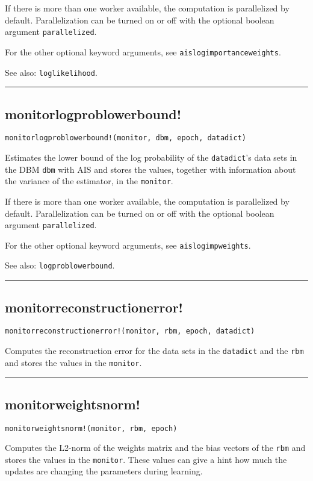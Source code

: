 If there is more than one worker available, the computation is parallelized by default. Parallelization can be turned on or off with the optional boolean argument \texttt{parallelized}.

For the other optional keyword arguments, see \texttt{aislogimportanceweights}.

See also: \texttt{loglikelihood}.

\noindent\rule{\textwidth}{1pt}
\subsection*{monitorlogproblowerbound!}
\begin{verbatim}
monitorlogproblowerbound!(monitor, dbm, epoch, datadict)
\end{verbatim}
Estimates the lower bound of the log probability of the \texttt{datadict}'s data sets in the DBM \texttt{dbm} with AIS and stores the values, together with information about the variance of the estimator, in the \texttt{monitor}.

If there is more than one worker available, the computation is parallelized by default. Parallelization can be turned on or off with the optional boolean argument \texttt{parallelized}.

For the other optional keyword arguments, see \texttt{aislogimpweights}.

See also: \texttt{logproblowerbound}.

\noindent\rule{\textwidth}{1pt}
\subsection*{monitorreconstructionerror!}
\begin{verbatim}
monitorreconstructionerror!(monitor, rbm, epoch, datadict)
\end{verbatim}
Computes the reconstruction error for the data sets in the \texttt{datadict} and the \texttt{rbm} and stores the values in the \texttt{monitor}.

\noindent\rule{\textwidth}{1pt}
\subsection*{monitorweightsnorm!}
\begin{verbatim}
monitorweightsnorm!(monitor, rbm, epoch)
\end{verbatim}
Computes the L2-norm of the weights matrix and the bias vectors of the \texttt{rbm} and stores the values in the \texttt{monitor}. These values can give a hint how much the updates are changing the parameters during learning.

